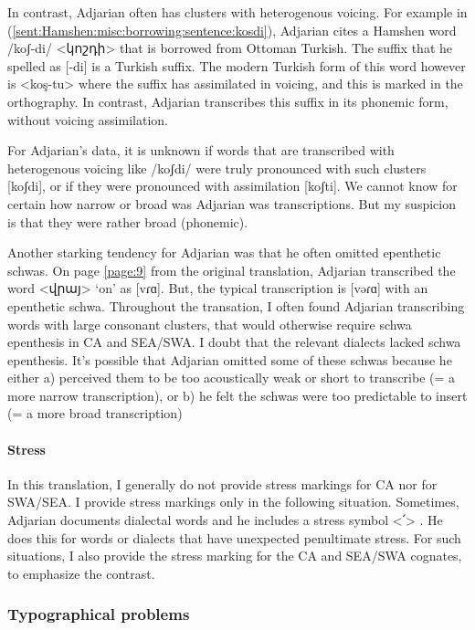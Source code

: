 In contrast, Adjarian often has clusters with heterogenous voicing. For example in (\ref{sent:Hamshen:misc:borrowing:sentence:kosdi}), Adjarian cites a Hamshen word /koʃ-di/ <կոշդի> that is borrowed from Ottoman Turkish. The suffix that he spelled as [-di] is a Turkish suffix.  The modern Turkish form of this word however is <koş-tu> where the suffix has assimilated in voicing, and this is marked in the orthography. In contrast, Adjarian transcribes this suffix in its phonemic form, without voicing assimilation.

For Adjarian's data, it is unknown if words that are transcribed with heterogenous voicing like /koʃdi/ were truly pronounced with such clusters [koʃdi], or if they were pronounced with assimilation [koʃti]. We cannot know for certain how narrow or broad was Adjarian was transcriptions. But my suspicion is that they were rather broad (phonemic). 

Another starking tendency for Adjarian was that he often omitted epenthetic schwas. On page \ref{page:9} from the original translation, Adjarian transcribed the word <վրայ> `on' as [vɾɑ]. But, the typical transcription is [vəɾɑ] with an epenthetic schwa. Throughout the transation, I often found Adjarian transcribing words with large consonant clusters, that would otherwise require schwa epenthesis in CA and SEA/SWA. I doubt that the relevant dialects lacked schwa epenthesis. It's possible that  Adjarian omitted some of these schwas because he either a) perceived them to be too acoustically weak or short to transcribe (= a more narrow transcription), or b) he felt the schwas were too predictable to insert (= a more broad transcription) 



\paragraph{Stress}
In this translation, I generally do not provide stress markings for CA nor for SWA/SEA. I provide stress markings only in the following situation. Sometimes, Adjarian documents dialectal words and he includes a stress symbol <՛> . He does this for words or dialects that have unexpected penultimate stress. For such situations, I also provide the stress marking for the CA and SEA/SWA cognates, to emphasize the contrast. 

\subsubsection{Typographical problems}\label{sec:HossepIntro:phonotransc:adj:typograph}

